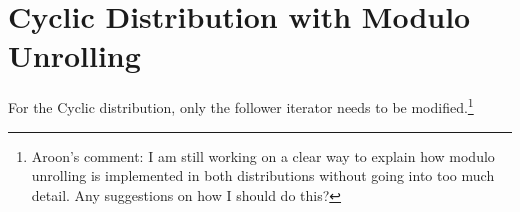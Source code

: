 \section{Cyclic Distribution with Modulo Unrolling}\label{sec:cyclic_modulo}

For the Cyclic distribution, only the follower iterator needs to be modified.\footnote{Aroon's comment: I am still working on a clear way to explain how modulo unrolling is implemented in both distributions without going into too much detail. Any suggestions on how I should do this?}